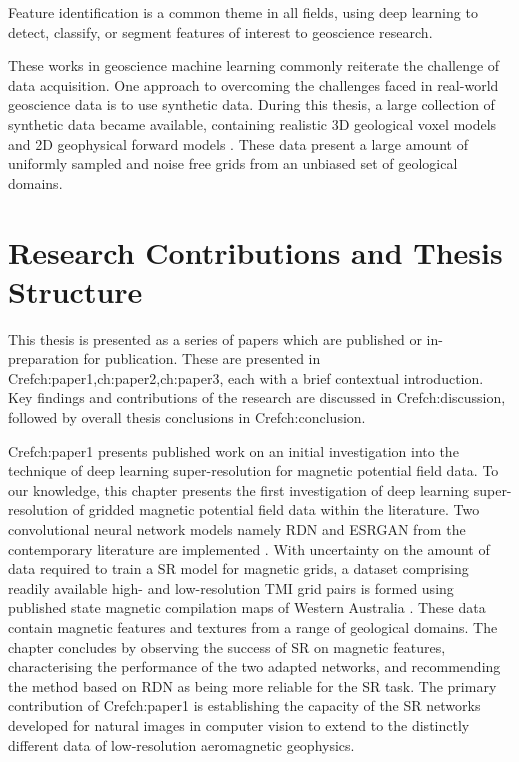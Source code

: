 \documentclass[manuscript.tex]{subfiles}
\begin{document}
Feature identification is a common theme in all fields, using deep learning to detect, classify, or segment features of interest to geoscience research. 

These works in geoscience machine learning commonly reiterate the challenge of data acquisition.
One approach to overcoming the challenges faced in real-world geoscience data is to use synthetic data.
During this thesis, a large collection of synthetic data became available, containing realistic 3D geological voxel models and 2D geophysical forward models \parencite{jessellNoddyverseMassiveData2022}.
These data present a large amount of uniformly sampled and noise free grids from an unbiased set of geological domains.

\section{Research Contributions and Thesis Structure}
This thesis is presented as a series of papers which are published or in-preparation for publication.
These are presented in Cref{ch:paper1,ch:paper2,ch:paper3}, each with a brief contextual introduction.
Key findings and contributions of the research are discussed in Cref{ch:discussion}, followed by overall thesis conclusions in Cref{ch:conclusion}.

Cref{ch:paper1} presents published work on an initial investigation into the technique of deep learning super-resolution for magnetic potential field data.
To our knowledge, this chapter presents the first investigation of deep learning super-resolution of gridded magnetic potential field data within the literature.
Two convolutional neural network models namely RDN and ESRGAN from the contemporary literature are implemented \parencite{zhangResidualDenseNetwork2018,limEnhancedDeepResidual2017}.
With uncertainty on the amount of data required to train a SR model for magnetic grids, a dataset comprising readily available high- and low-resolution TMI grid pairs is formed using published state magnetic compilation maps of Western Australia \parencite{brett20MagneticMerged2020}.
These data contain magnetic features and textures from a range of geological domains.
The chapter concludes by observing the success of SR on magnetic features, characterising the performance of the two adapted networks, and recommending the method based on RDN as being more reliable for the SR task.
The primary contribution of Cref{ch:paper1} is establishing the capacity of the SR networks developed for natural images in computer vision to extend to the distinctly different data of low-resolution aeromagnetic geophysics.
\end{document}
